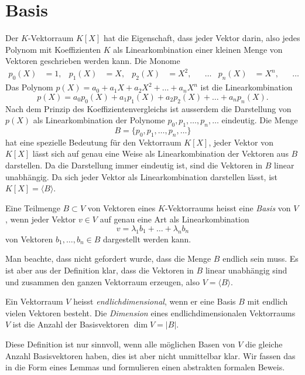 %
%
%
\section{Basis}
Der $K$-Vektorraum $K[X]$ hat die Eigenschaft, dass jeder Vektor darin,
also jedes Polynom mit Koeffizienten $K$ als Linearkombination einer
kleinen Menge von Vektoren geschrieben werden kann.
Die Monome
\[
\begin{aligned}
p_0(X)&=1,
&
p_1(X)&=X,
&
p_2(X)&=X^2,
&&\dots&
p_n(X)&=X^n,
&&\dots
\end{aligned}
\]
Das Polynom $p(X)=a_0+a_1X+a_2X^2+\dots+a_nX^n$ ist die Linearkombination
\[
p(X)
=
a_0p_0(X)
+
a_1p_1(X)
+
a_2p_2(X)
+\dots
+
a_np_n(X).
\]
Nach dem Prinzip des Koeffizientenvergleichs
ist ausserdem die Darstellung von $p(X)$ als Linearkombination
der Polynome $p_0,p_1,\dots,p_n,\dots$ eindeutig.
Die Menge
\[
B=\{p_0,p_1,\dots,p_n,\dots\}
\]
hat eine spezielle Bedeutung für den Vektorraum $K[X]$, jeder Vektor
von $K[X]$ lässt sich auf genau eine Weise als Linearkombination der
Vektoren aus $B$ darstellen.
Da die Darstellung immer eindeutig ist, sind die Vektoren in $B$
linear unabhängig.
Da sich jeder Vektor als Linearkombination darstellen lässt, ist
$K[X]=\langle B\rangle$.

\begin{definition}
Eine Teilmenge $B\subset V$ von Vektoren eines $K$-Vektorraums heisst
eine {\em Basis} von $V$, wenn jeder Vektor $v\in V$ auf genau eine Art
als Linearkombination
\[
v=\lambda_1b_1+\dots+\lambda_nb_n
\]
von Vektoren $b_1,\dots,b_n\in B$ dargestellt werden kann.
\end{definition}

Man beachte, dass nicht gefordert wurde, dass die Menge $B$ endlich sein
muss.
Es ist aber aus der Definition klar, dass die Vektoren in $B$ linear
unabhängig sind und zusammen den ganzen Vektorraum erzeugen,
also $V=\langle B\rangle$.

\begin{definition}
Ein Vektorraum $V$ heisst {\em endlichdimensional}, wenn er eine Basis $B$
mit endlich vielen Vektoren besteht.
Die {\em Dimension} eines endlichdimensionalen Vektorraums $V$ ist
die Anzahl der Basisvektoren $\operatorname{dim} V = |B|$.
\end{definition}

Diese Definition ist nur sinnvoll, wenn alle möglichen Basen von $V$ die
gleiche Anzahl Basisvektoren haben, dies ist aber nicht unmittelbar klar.
Wir fassen das in die Form eines Lemmas und formulieren einen abstrakten
formalen Beweis.


